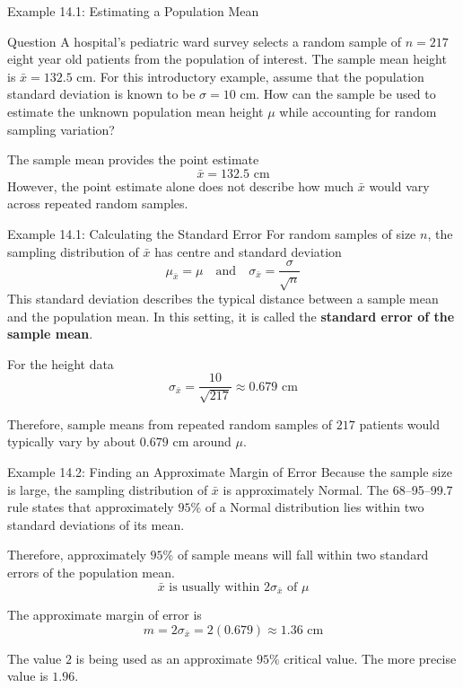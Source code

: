 \documentclass[aspectratio=169]{beamer}
\begin{document}
\begin{frame}{Example 14.1: Estimating a Population Mean}
\begin{block}{Question}
A hospital's pediatric ward survey selects a random sample of $n=217$ eight year old patients from the population of interest. The sample mean height is $\bar{x}=132.5$ cm. For this introductory example, assume that the population standard deviation is known to be $\sigma=10$ cm. How can the sample be used to estimate the unknown population mean height $\mu$ while accounting for random sampling variation?
\end{block}

\vspace{0.2cm}
The sample mean provides the point estimate
$$\bar{x}=132.5\text{ cm}$$
However, the point estimate alone does not describe how much $\bar{x}$ would vary across repeated random samples.
\end{frame}

\begin{frame}{Example 14.1: Calculating the Standard Error}
For random samples of size $n$, the sampling distribution of $\bar{x}$ has centre and standard deviation 
$$\mu_{\bar{x}}=\mu \quad \text{and} \quad \sigma_{\bar{x}}=\frac{\sigma}{\sqrt{n}}$$
This standard deviation describes the typical distance between a sample mean and the population mean. In this setting, it is called the \textbf{standard error of the sample mean}.

\vspace{0.2cm}
For the height data
$$\sigma_{\bar{x}}=\frac{10}{\sqrt{217}}\approx 0.679\text{ cm}$$

Therefore, sample means from repeated random samples of $217$ patients would typically vary by about $0.679$ cm around $\mu$.
\end{frame}

\begin{frame}{Example 14.2: Finding an Approximate Margin of Error}
Because the sample size is large, the sampling distribution of $\bar{x}$ is approximately Normal. The 68--95--99.7 rule states that approximately $95\%$ of a Normal distribution lies within two standard deviations of its mean.

\vspace{0.2cm}
Therefore, approximately $95\%$ of sample means will fall within two standard errors of the population mean.
$$\bar{x}\text{ is usually within }2\sigma_{\bar{x}}\text{ of }\mu$$

The approximate margin of error is
$$m=2\sigma_{\bar{x}}=2(0.679)\approx 1.36\text{ cm}$$

The value $2$ is being used as an approximate $95\%$ critical value. The more precise value is $1.96$.
\end{frame}
\end{document}
